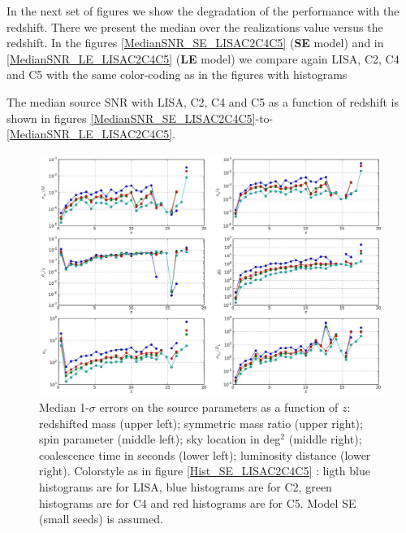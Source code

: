 \documentclass{iopart}
\begin{document}


In the next set of figures we show the degradation of the performance with the redshift. There we present the median over the 
realizations value versus the redshift. In the figures \ref{MedianSNR_SE_LISAC2C4C5} ({\bf SE} model) and in 
\ref{MedianSNR_LE_LISAC2C4C5} ({\bf LE} model) we compare again LISA, C2, C4 and C5 with the same color-coding as 
in the figures with histograms



The median source SNR with LISA, C2, C4 and C5 as a function of redshift is shown in figures \ref{MedianSNR_SE_LISAC2C4C5}-to-\ref{MedianSNR_LE_LISAC2C4C5}.


\begin{figure}[H]
\center
   \includegraphics[width=\textwidth]{FigSMBHPhenomAEI/MedianErrs_SE_LISAC2C4C5.eps}
\caption{Median 1-$\sigma$ errors on the source parameters as a function of 
$z$: redshifted mass (upper left); symmetric mass ratio (upper right); spin parameter (middle left); sky location in deg$^2$ (middle right); coalescence time in seconds (lower left); luminosity distance (lower right). Colorstyle as in figure \ref{Hist_SE_LISAC2C4C5} : ligth blue histograms are for LISA, blue histograms are for C2, green histograms are for C4 and red histograms are for C5. Model SE (small seeds) is assumed.
\label{MedianErrs_SE_LISAC2C4C5} } 
\end{figure}
\end{document}
